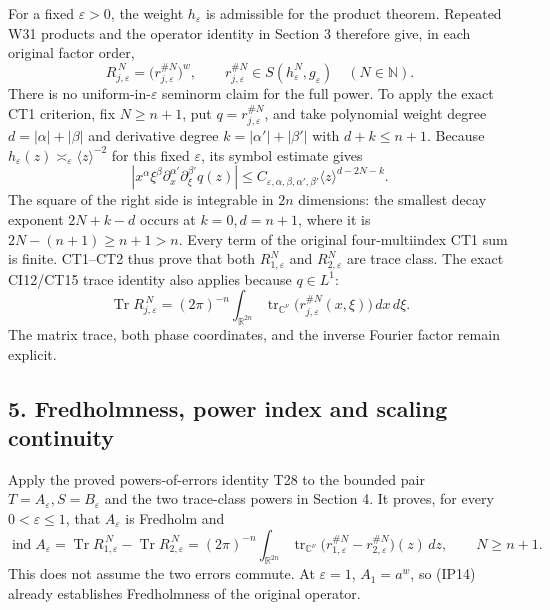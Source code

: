 \documentclass[
  11pt,
]{article}
\begin{document}
For a fixed \(\varepsilon>0\), the weight \(h_\varepsilon\) is
admissible for the product theorem. Repeated W31 products and the
operator identity in Section 3 therefore give, in each original factor
order, \[
 R_{j,\varepsilon}^{\,N}
   =\bigl(r_{j,\varepsilon}^{\# N}\bigr)^w,\qquad
 r_{j,\varepsilon}^{\# N}
   \in S(h_\varepsilon^N,g_\varepsilon)
       \quad(N\in\mathbb N).
 \tag{IP11}
\] There is no uniform-in-\(\varepsilon\) seminorm claim for the full
power. To apply the exact CT1 criterion, fix \(N\ge n+1\), put
\(q=r_{j,\varepsilon}^{\# N}\), and take polynomial weight degree
\(d=|\alpha|+|\beta|\) and derivative degree \(k=|\alpha'|+|\beta'|\)
with \(d+k\le n+1\). Because
\(h_\varepsilon(z)\asymp_\varepsilon\langle z\rangle^{-2}\) for this
fixed \(\varepsilon\), its symbol estimate gives \[
 |x^\alpha\xi^\beta
    \partial_x^{\alpha'}\partial_\xi^{\beta'}q(z)|
 \le C_{\varepsilon,\alpha,\beta,\alpha',\beta'}
        \langle z\rangle^{d-2N-k}.
 \tag{IP12}
\] The square of the right side is integrable in \(2n\) dimensions: the
smallest decay exponent \(2N+k-d\) occurs at \(k=0,d=n+1\), where it is
\(2N-(n+1)\ge n+1>n\). Every term of the original four-multiindex CT1
sum is finite. CT1--CT2 thus prove that both \(R_{1,\varepsilon}^N\) and
\(R_{2,\varepsilon}^N\) are trace class. The exact CI12/CT15 trace
identity also applies because \(q\in L^1\): \[
 \operatorname{Tr}R_{j,\varepsilon}^{\,N}
 =(2\pi)^{-n}\int_{\mathbb R^{2n}}
        \operatorname{tr}_{\mathbb C^\nu}
          \bigl(r_{j,\varepsilon}^{\# N}(x,\xi)\bigr)
          \,dx\,d\xi .
 \tag{IP13}
\] The matrix trace, both phase coordinates, and the inverse Fourier
factor remain explicit.

\subsection{5. Fredholmness, power index and scaling
continuity}\label{fredholmness-power-index-and-scaling-continuity}

Apply the proved powers-of-errors identity T28 to the bounded pair
\(T=A_\varepsilon,S=B_\varepsilon\) and the two trace-class powers in
Section 4. It proves, for every \(0<\varepsilon\le1\), that
\(A_\varepsilon\) is Fredholm and \[
 \operatorname{ind}A_\varepsilon
 =\operatorname{Tr}R_{1,\varepsilon}^{\,N}
  -\operatorname{Tr}R_{2,\varepsilon}^{\,N}
 =(2\pi)^{-n}\int_{\mathbb R^{2n}}
   \operatorname{tr}_{\mathbb C^\nu}
   \bigl(r_{1,\varepsilon}^{\# N}
        -r_{2,\varepsilon}^{\# N}\bigr)(z)\,dz ,
 \qquad N\ge n+1.
 \tag{IP14}
\] This does not assume the two errors commute. At \(\varepsilon=1\),
\(A_1=a^w\), so (IP14) already establishes Fredholmness of the original
operator.
\end{document}
